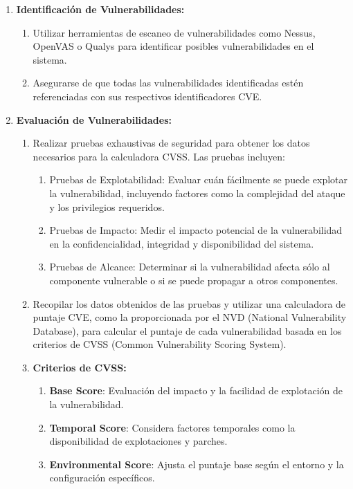 \begin{enumerate}
    \item \textbf{Identificación de Vulnerabilidades:}
    \begin{enumerate}
        \item Utilizar herramientas de escaneo de vulnerabilidades como Nessus, OpenVAS o Qualys para identificar posibles vulnerabilidades en el sistema.
        \item Asegurarse de que todas las vulnerabilidades identificadas estén referenciadas con sus respectivos identificadores CVE.
    \end{enumerate}
    
    \item \textbf{Evaluación de Vulnerabilidades:}
    \begin{enumerate}
        \item Realizar pruebas exhaustivas de seguridad para obtener los datos necesarios para la calculadora CVSS. Las pruebas incluyen:
        \begin{enumerate}
            \item Pruebas de Explotabilidad: Evaluar cuán fácilmente se puede explotar la vulnerabilidad, incluyendo factores como la complejidad del ataque y los privilegios requeridos.
            \item Pruebas de Impacto: Medir el impacto potencial de la vulnerabilidad en la confidencialidad, integridad y disponibilidad del sistema.
            \item Pruebas de Alcance: Determinar si la vulnerabilidad afecta sólo al componente vulnerable o si se puede propagar a otros componentes.
        \end{enumerate}
        \item Recopilar los datos obtenidos de las pruebas y utilizar una calculadora de puntaje CVE, como la proporcionada por el NVD (National Vulnerability Database), para calcular el puntaje de cada vulnerabilidad basada en los criterios de CVSS (Common Vulnerability Scoring System).
        \item \textbf{Criterios de CVSS:}
        \begin{enumerate}
            \item \textbf{Base Score}: Evaluación del impacto y la facilidad de explotación de la vulnerabilidad.
            \item \textbf{Temporal Score}: Considera factores temporales como la disponibilidad de explotaciones y parches.
            \item \textbf{Environmental Score}: Ajusta el puntaje base según el entorno y la configuración específicos.
        \end{enumerate}
    \end{enumerate}


\end{enumerate}
